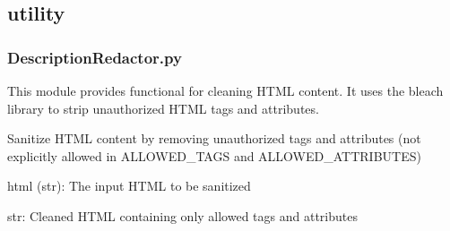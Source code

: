 \documentclass[letterpaper,10pt,english]{sphinxmanual}
\begin{document}
\subsection{utility}
\label{\detokenize{store-service:utility}}

\subsubsection{DescriptionRedactor.py}
\label{\detokenize{store-service:module-DescriptionRedactor}}\label{\detokenize{store-service:descriptionredactor-py}}
\sphinxAtStartPar
This module provides functional for cleaning HTML content. It uses the bleach library to strip unauthorized HTML tags and attributes.

\begin{fulllineitems}
\label{\detokenize{store-service:DescriptionRedactor.sanitize_html}}
\pysigstartsignatures
\pysiglinewithargsret
{}
{}
{}
\pysigstopsignatures
\sphinxAtStartPar
Sanitize HTML content by removing unauthorized tags and attributes (not explicitly allowed in ALLOWED\_TAGS and ALLOWED\_ATTRIBUTES)
\begin{description}
\sphinxAtStartPar
html (str): The input HTML to be sanitized

\sphinxAtStartPar
str: Cleaned HTML containing only allowed tags and attributes

\end{description}

\end{fulllineitems}
\end{document}
